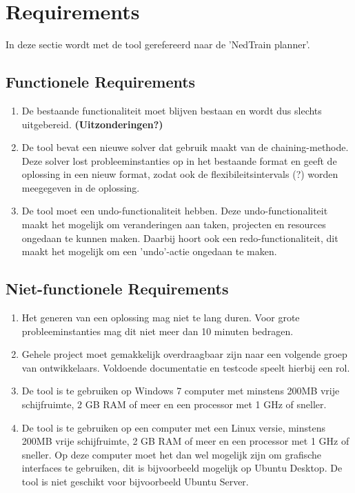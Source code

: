 \section{Requirements}
In deze sectie wordt met de tool gerefereerd naar de 'NedTrain planner'.

\subsection{Functionele Requirements}
\begin{enumerate}
    \item De bestaande functionaliteit moet blijven bestaan en wordt dus slechts uitgebereid. \textbf{(Uitzonderingen?)}
    \item De tool bevat een nieuwe solver dat gebruik maakt van de chaining-methode. Deze solver lost probleeminstanties op in het bestaande format en geeft de oplossing in een nieuw format, zodat ook de flexibileitsintervals (?) worden meegegeven in de oplossing. 
    \item De tool moet een undo-functionaliteit hebben. Deze undo-functionaliteit maakt het mogelijk om veranderingen aan taken, projecten en resources ongedaan te kunnen maken. Daarbij hoort ook een redo-functionaliteit, dit maakt het mogelijk om een 'undo'-actie ongedaan te maken.
\end{enumerate}

\subsection{Niet-functionele Requirements}
\begin{enumerate}
    \item Het generen van een oplossing mag niet te lang duren. Voor grote probleeminstanties mag dit niet meer dan 10 minuten bedragen. 
    \item Gehele project moet gemakkelijk overdraagbaar zijn naar een volgende groep van ontwikkelaars. Voldoende documentatie en testcode speelt hierbij een rol.
    \item De tool is te gebruiken op Windows 7 computer met minstens 200MB vrije schijfruimte, 2 GB RAM of meer en een processor met 1 GHz of sneller.
    \item De tool is te gebruiken op een computer met een Linux versie, minstens 200MB vrije schijfruimte, 2 GB RAM of meer en een processor met 1 GHz of sneller. Op deze computer moet het dan wel mogelijk zijn om grafische interfaces te gebruiken, dit is bijvoorbeeld mogelijk op Ubuntu Desktop. De tool is niet geschikt voor bijvoorbeeld Ubuntu Server. 
\end{enumerate}
